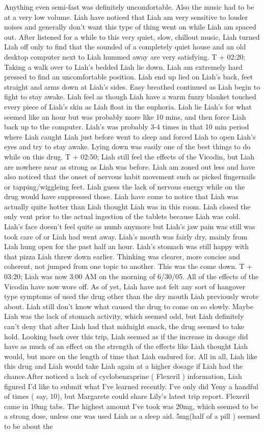 \documentclass[12pt]{book}
\begin{document}
Anything even semi-fast was definitely uncomfortable. Also the music had to be at a very low volume. Liah have noticed that Liah am very sensitive to louder noises and generally don't want this type of thing went on while Liah am spaced out. After listened for a while to this very quiet, slow, chillout music, Liah turned Liah off only to find that the sounded of a completely quiet house and an old desktop computer next to Liah hummed away are very satisfying. T + 02:20; Taking a walk over to Liah's bedded Liah lie down. Liah am extremely hard pressed to find an uncomfortable position. Liah end up lied on Liah's back, feet straight and arms down at Liah's sides. Easy breathed continued as Liah begin to fight to stay awake. Liah feel as though Liah have a warm fuzzy blanket touched every piece of Liah's skin as Liah float in the euphoria. Liah lie Liah's for what seemed like an hour but was probably more like 10 mins, and then force Liah back up to the computer. Liah's was probably 3-4 times in that 10 min period where Liah caught Liah just before went to sleep and forced Liah to open Liah's eyes and try to stay awake. Lying down was easily one of the best things to do while on this drug. T + 02:50; Liah still feel the effects of the Vicodin, but Liah are nowhere near as strong as Liah was before. Liah am zoned out less and have also noticed that the onset of nervous habit movement such as picked fingernails or tapping/wiggleing feet. Liah guess the lack of nervous energy while on the drug would have suppressed those. Liah have come to notice that Liah was actually quite hotter than Liah thought Liah was in this room. Liah closed the only vent prior to the actual ingestion of the tablets because Liah was cold. Liah's face doesn't feel quite as numb anymore but Liah's jaw pain was still was took care of or Liah had went away. Liah's mouth was fairly dry, mainly from Liah hung open for the past half an hour. Liah's stomach was still happy with that pizza Liah threw down earlier. Thinking was clearer, more concise and coherent, not jumped from one topic to another. This was the come down. T + 03:20; Liah was now 3:00 AM on the morning of 6/30/05. All of the effects of the Vicodin have now wore off. As of yet, Liah have not felt any sort of hangover type symptoms of used the drug other than the dry mouth Liah previously wrote about. Liah still don't know what caused the drug to come on so slowly. Maybe Liah was the lack of stomach activity, which seemed odd, but Liah definitely can't deny that after Liah had that midnight snack, the drug seemed to take hold. Looking back over this trip, Liah seemed as if the increase in dosage did have as much of an effect on the strength of the effects like Liah thought Liah would, but more on the length of time that Liah endured for. All in all, Liah like this drug and Liah would take Liah again at a higher dosage if Liah had the chance.After noticed a lack of cyclobenzaprine ( Flexeril ) information, Liah figured I'd like to submit what I've learned recently. I've only did Yeny a handful of times ( say, 10), but Margarete could share Lily's latest trip report. Flexeril came in 10mg tabs. The highest amount I've took was 20mg, which seemed to be a strong dose, unless one was used Liah as a sleep aid. 5mg(half of a pill ) seemed to be about the 
\end{document}
